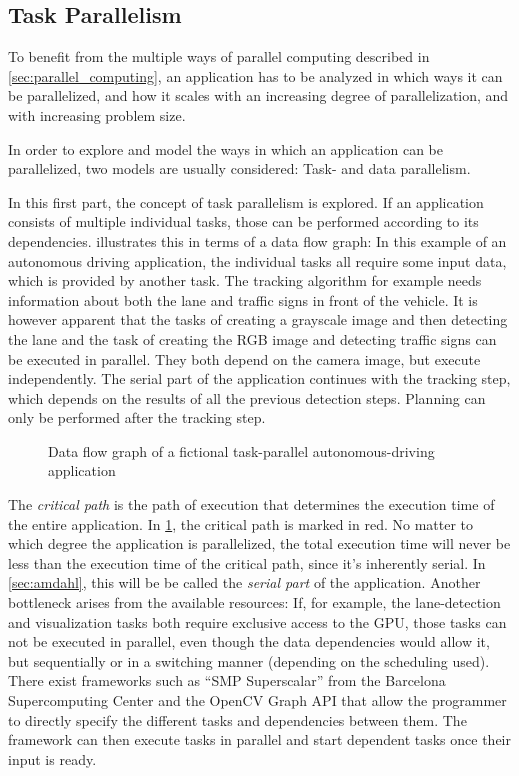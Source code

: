 \documentclass[BCOR20mm,DIV14,10pt,headinclude,footexclude,bibtotoc,liststotoc]{article}
\begin{document}
\subsection{Task Parallelism}
\label{sec:task_parallel}
To benefit from the multiple ways of parallel computing described in
\cref{sec:parallel_computing}, an application has to be analyzed in which ways
it can be parallelized, and how it scales with an increasing degree of
parallelization, and with increasing problem size.

In order to explore and model the ways in which an application can be
parallelized, two models are usually considered: Task- and data parallelism.

In this first part, the concept of task parallelism is explored. If an
application consists of multiple individual tasks, those can be performed
according to its dependencies.  illustrates this in terms
of a data flow graph: In this example of an autonomous driving application, the
individual tasks all require some input data, which is provided by another task.
The tracking algorithm for example needs information about both the lane and
traffic signs in front of the vehicle. It is however apparent that the tasks of
creating a grayscale image and then detecting the lane and the task of creating
the RGB image and detecting traffic signs can be executed in parallel. They both
depend on the camera image, but execute independently. The serial part of the
application continues with the tracking step, which depends on the results of
all the previous detection steps. Planning can only be performed after the
tracking step.

\begin{figure}
	\centering
	
	\caption{Data flow graph of a fictional task-parallel autonomous-driving application}
	\label{fig:task_graph}
\end{figure}

The \emph{critical path} is the path of execution that determines the execution
time of the entire application. In \cref{fig:task_graph}, the critical path is
marked in red. No matter to which degree the application is parallelized, the
total execution time will never be less than the execution time of the critical
path, since it's inherently serial. In \cref{sec:amdahl}, this will be be called
the \emph{serial part} of the application. Another bottleneck arises from the
available resources: If, for example, the lane-detection and visualization tasks
both require exclusive access to the GPU, those tasks can not be executed in
parallel, even though the data dependencies would allow it, but sequentially or
in a switching manner (depending on the scheduling used). There exist frameworks
such as ``SMP Superscalar'' from the Barcelona Supercomputing Center \cite{hpci}
and the OpenCV Graph API that allow the programmer to directly specify the
different tasks and dependencies between them. The framework can then execute
tasks in parallel and start dependent tasks once their input is ready.
\end{document}

